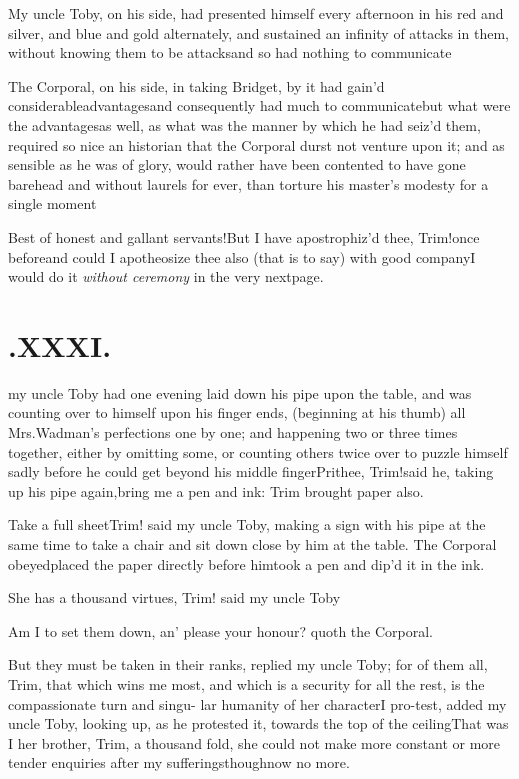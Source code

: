 \documentclass{article}
\begin{document}
My uncle Toby, on his side, had presented himself every
afternoon in his red and silver, and blue and gold alternately, and
sustained an infinity of attacks in them, without knowing them to
be attacks\tsk and so had nothing to
communicate\tsh{}

The Corporal, on his side, in taking Bridget, by it had
gain’d considerable\break advantages\tsk\tsk and consequently
had much to communicate\tsh but what were the
advantages\tsh as well, as what was the manner by which he
had seiz’d them, required so nice an historian that the
Corporal durst not venture upon it; and as sensible as he was of
glory, would rather have been contented to have gone barehead and
without laurels for ever, than torture his master’s modesty\break
for a single moment\tsh

\tsh Best of honest and gallant
servants!\tsh But I have apostrophiz’d thee,
Trim!\@ once before\tsh and could I apotheosize thee
also (that is to say) with good company\tsh I would do it
\textit{without ceremony} in the very next\break page.

\vfill{}\eject
\null
\section{.\enspace XXXI.}

 my uncle Toby had one
evening laid down his pipe upon\break 
the table, and was counting over to
himself upon his finger ends, (beginning at his thumb) all 
Mrs.\@ Wadman’s perfections one by one; and happening two or
three times together, either by omitting some, or counting
others twice over to puzzle himself sadly before he could get
beyond his middle finger\tsh Pri\-thee, Trim!\@ said
he, taking up his pipe\break 
again,\thinspace\tsh bring me a pen and ink:\break
Trim brought paper also.

\vfill{}\eject

Take a full sheet\tsh Trim! said my uncle
Toby, making a sign with his pipe at the same time to take a
chair and sit down close by him at the table. The Corporal
obeyed\tsh placed the paper directly before
him\tsh took a pen and dip’d it in the ink.

\tsk She has a thousand virtues, Trim! said my uncle
Toby\tsh

Am I to set them down, an’ please your honour? quoth the
Corporal.

\tsh But they must be taken in their ranks, replied my
uncle Toby; for of them all, Trim, that which wins me
most, and which is a security for all the rest, is the
compassionate turn and singu- lar humanity of her character\tsk I
pro-\break test, added my uncle Toby, looking up, as he protested
it, towards the top of the ceiling\tsk That was I her brother, Trim, a
thousand fold, she could not make more constant or more tender
enquiries after my sufferings\tsh though\break now no more.
\end{document}
